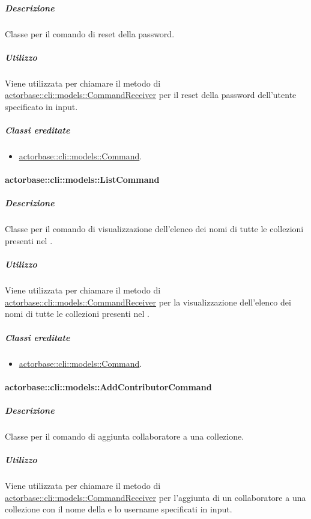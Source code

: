 \documentclass{scalatekids-article}
\begin{document}
\subparagraph{Descrizione}

Classe per il comando di reset della password.

\subparagraph{Utilizzo}

Viene utilizzata per chiamare il metodo di
\hyperref[sec:actorbase::cli::models::CommandReceiver]{actorbase::cli::models::CommandReceiver} per il reset della password
dell'utente specificato in input.

\subparagraph{Classi ereditate}

\begin{itemize}
\item \hyperref[sec:actorbase::cli::models::Command]{actorbase::cli::models::Command}.
\end{itemize}

\paragraph{actorbase::cli::models::ListCommand}
\label{sec:actorbase::cli::models::ListCommand}

\subparagraph{Descrizione}

Classe per il comando di visualizzazione dell'elenco dei nomi di tutte le
collezioni presenti nel .

\subparagraph{Utilizzo}

Viene utilizzata per chiamare il metodo di
\hyperref[sec:actorbase::cli::models::CommandReceiver]{actorbase::cli::models::CommandReceiver} per la visualizzazione dell'elenco dei
nomi di tutte le collezioni presenti nel .

\subparagraph{Classi ereditate}

\begin{itemize}
\item \hyperref[sec:actorbase::cli::models::Command]{actorbase::cli::models::Command}.
\end{itemize}

\paragraph{actorbase::cli::models::AddContributorCommand}
\label{sec:actorbase::cli::models::AddContributorCommand}

\subparagraph{Descrizione}

Classe per il comando di aggiunta collaboratore a una collezione.

\subparagraph{Utilizzo}

Viene utilizzata per chiamare il metodo di
\hyperref[sec:actorbase::cli::models::CommandReceiver]{actorbase::cli::models::CommandReceiver} per l'aggiunta di un collaboratore a
una collezione con il nome della  e lo username specificati
in input.
\end{document}
